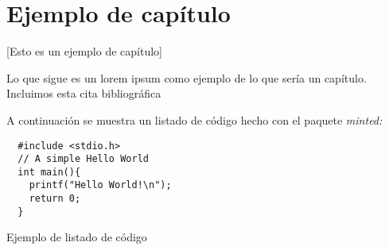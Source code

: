 \chapter{Ejemplo de capítulo}

[Esto es un ejemplo de capítulo]

Lo que sigue es un lorem ipsum como ejemplo de lo que sería un capítulo. Incluimos esta cita bibliográfica \cite{recomendaciones}

\lipsum


A continuación se muestra un listado de código hecho con el paquete \emph{minted:}


\begin{code} %
\begin{verbatim}
  #include <stdio.h>
  // A simple Hello World
  int main(){
    printf("Hello World!\n");
    return 0;
  }
\end{verbatim}
\caption{Ejemplo de listado de código}
\end{code}

